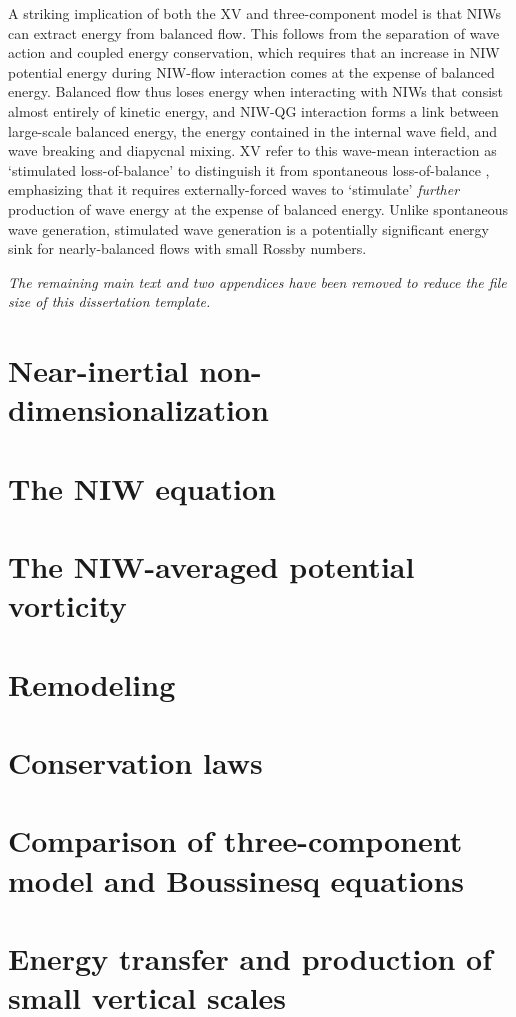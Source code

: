 \documentclass[12pt, oneside]{book}
\begin{document}
A striking implication of both the XV and three-component model is that NIWs can extract energy from balanced flow.  This follows from the separation of wave action and coupled energy conservation, which requires that an increase in NIW potential energy during NIW-flow interaction comes at the expense of balanced energy.  Balanced flow thus loses energy when interacting with NIWs that consist almost entirely of kinetic energy, and NIW-QG interaction forms a link between large-scale balanced energy, the energy contained in the internal wave field, and wave breaking and diapycnal mixing.  XV refer to this wave-mean interaction as `stimulated loss-of-balance' to distinguish it from spontaneous loss-of-balance \citep{Vanneste2013}, emphasizing that it requires externally-forced waves to `stimulate' {\it further} production of wave energy at the expense of balanced energy.  Unlike spontaneous wave generation, stimulated wave generation is a potentially significant energy sink for nearly-balanced flows with small Rossby numbers. 

\bigskip \textit{The remaining main text and two appendices have been removed to reduce the file size of this dissertation template.}

\section{Near-inertial non-dimensionalization}
\section{The NIW equation} \label{niwexpansion}
\section{The NIW-averaged potential vorticity}
\section{Remodeling}
\section{Conservation laws} \label{conservationlaws}
\section{Comparison of three-component model and Boussinesq equations} \label{simulations}
\section{Energy transfer and production of small vertical scales}
\end{document}
